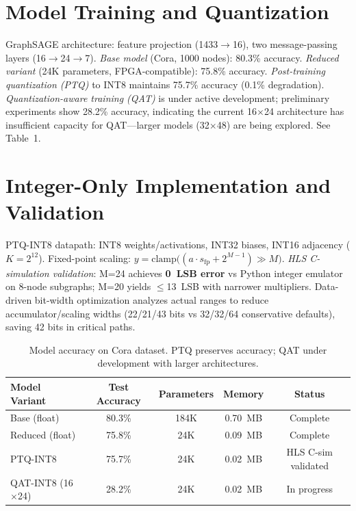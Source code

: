 \documentclass[10pt]{article}
\begin{document}
\section*{Model Training and Quantization}
GraphSAGE architecture: feature projection (1433$\to$16), two message-passing layers (16$\to$24$\to$7). \emph{Base model} (Cora, 1000 nodes): 80.3\% accuracy. \emph{Reduced variant} (24K parameters, FPGA-compatible): 75.8\% accuracy. \emph{Post-training quantization (PTQ)} to INT8 maintains 75.7\% accuracy (0.1\% degradation). \emph{Quantization-aware training (QAT)} is under active development; preliminary experiments show 28.2\% accuracy, indicating the current 16$\times$24 architecture has insufficient capacity for QAT—larger models (32$\times$48) are being explored. See Table~1.

\vspace{-0.2em}
\section*{Integer-Only Implementation and Validation}
PTQ-INT8 datapath: INT8 weights/activations, INT32 biases, INT16 adjacency ($K=2^{12}$). Fixed-point scaling: $y = \mathrm{clamp}\big((a\cdot s_{\text{fp}} + 2^{M-1}) \gg M\big)$. \emph{HLS C-simulation validation}: M=24 achieves \textbf{0~LSB error} vs Python integer emulator on 8-node subgraphs; M=20 yields $\leq$13~LSB with narrower multipliers. Data-driven bit-width optimization analyzes actual ranges to reduce accumulator/scaling widths (22/21/43 bits vs 32/32/64 conservative defaults), saving 42 bits in critical paths.

\vspace{-0.2em}
\begin{table}[h!]
\centering
\small
\begin{tabular}{lcccc}
\toprule
Model Variant & Test Accuracy & Parameters & Memory & Status\\
\midrule
Base (float) & 80.3\% & 184K & 0.70~MB & Complete\\
Reduced (float) & 75.8\% & 24K & 0.09~MB & Complete\\
PTQ-INT8 & 75.7\% & 24K & 0.02~MB & HLS C-sim validated\\
QAT-INT8 (16$\times$24) & 28.2\% & 24K & 0.02~MB & In progress\\
\bottomrule
\end{tabular}
\vspace{-0.2em}
\caption{Model accuracy on Cora dataset. PTQ preserves accuracy; QAT under development with larger architectures.}
\label{tab:results}
\vspace{-0.8em}
\end{table}
\end{document}

